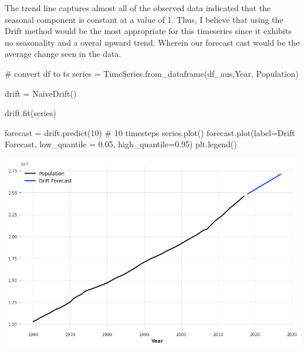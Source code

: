 \documentclass[
  11pt,
]{article}
\newenvironment{Shaded}{\begin{snugshade}}{\end{snugshade}}
\newcommand{\CommentTok}[1]{\textcolor[rgb]{0.37,0.37,0.37}{#1}}
\newcommand{\DecValTok}[1]{\textcolor[rgb]{0.68,0.00,0.00}{#1}}
\newcommand{\FloatTok}[1]{\textcolor[rgb]{0.68,0.00,0.00}{#1}}
\newcommand{\NormalTok}[1]{\textcolor[rgb]{0.00,0.23,0.31}{#1}}
\newcommand{\OperatorTok}[1]{\textcolor[rgb]{0.37,0.37,0.37}{#1}}
\newcommand{\StringTok}[1]{\textcolor[rgb]{0.13,0.47,0.30}{#1}}
\begin{document}
The trend line captures almost all of the observed data indicated that
the seasonal component is constant at a value of 1. Thus, I believe that
using the Drift method would be the most appropriate for this timeseries
since it exhibits no seasonality and a overal upward trend. Wherein our
forecast cast would be the average change seen in the data.

\begin{Shaded}
\begin{Highlighting}[]
\CommentTok{\# convert df to ts }
\NormalTok{series }\OperatorTok{=}\NormalTok{ TimeSeries.from\_dataframe(df\_aus,}\StringTok{\textquotesingle{}Year\textquotesingle{}}\NormalTok{, }\StringTok{\textquotesingle{}Population\textquotesingle{}}\NormalTok{)}
\end{Highlighting}
\end{Shaded}

\begin{Shaded}
\begin{Highlighting}[]
\NormalTok{drift }\OperatorTok{=}\NormalTok{ NaiveDrift()}

\NormalTok{drift.fit(series)}

\NormalTok{forecast }\OperatorTok{=}\NormalTok{ drift.predict(}\DecValTok{10}\NormalTok{) }\CommentTok{\# 10 timesteps}
\NormalTok{series.plot()}
\NormalTok{forecast.plot(label}\OperatorTok{=}\StringTok{\textquotesingle{}Drift Forecast\textquotesingle{}}\NormalTok{, low\_quantile }\OperatorTok{=} \FloatTok{0.05}\NormalTok{, high\_quantile}\OperatorTok{=}\FloatTok{0.95}\NormalTok{)}
\NormalTok{plt.legend()}
\end{Highlighting}
\end{Shaded}

\includegraphics{hw3_files/figure-pdf/cell-9-output-1.png}
\end{document}
